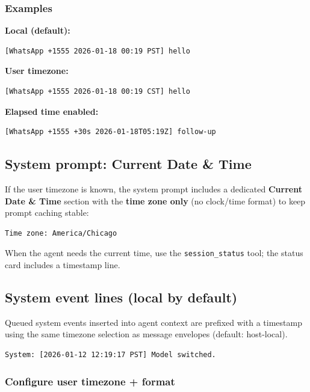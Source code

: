 \subsubsection{Examples}


\textbf{Local (default):}

\begin{lstlisting}
[WhatsApp +1555 2026-01-18 00:19 PST] hello
\end{lstlisting}


\textbf{User timezone:}

\begin{lstlisting}
[WhatsApp +1555 2026-01-18 00:19 CST] hello
\end{lstlisting}


\textbf{Elapsed time enabled:}

\begin{lstlisting}
[WhatsApp +1555 +30s 2026-01-18T05:19Z] follow-up
\end{lstlisting}


\subsection{System prompt: Current Date \& Time}


If the user timezone is known, the system prompt includes a dedicated
\textbf{Current Date \& Time} section with the \textbf{time zone only} (no clock/time format)
to keep prompt caching stable:

\begin{lstlisting}
Time zone: America/Chicago
\end{lstlisting}


When the agent needs the current time, use the \texttt{session\_status} tool; the status
card includes a timestamp line.

\subsection{System event lines (local by default)}


Queued system events inserted into agent context are prefixed with a timestamp using the
same timezone selection as message envelopes (default: host-local).

\begin{lstlisting}
System: [2026-01-12 12:19:17 PST] Model switched.
\end{lstlisting}


\subsubsection{Configure user timezone + format}


